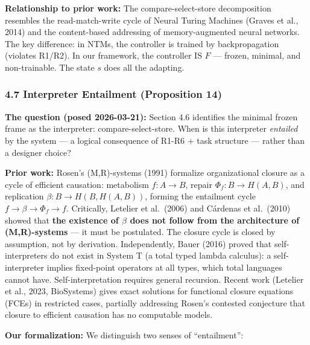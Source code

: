 \documentclass[
  11pt,
]{article}
\begin{document}
\textbf{Relationship to prior work:} The compare-select-store
decomposition resembles the read-match-write cycle of Neural Turing
Machines (Graves et al., 2014) and the content-based addressing of
memory-augmented neural networks. The key difference: in NTMs, the
controller is trained by backpropagation (violates R1/R2). In our
framework, the controller IS \(F\) --- frozen, minimal, and
non-trainable. The state \(s\) does all the adapting.

\subsubsection{4.7 Interpreter Entailment (Proposition
14)}\label{interpreter-entailment-proposition-14}

\textbf{The question (posed 2026-03-21):} Section 4.6 identifies the
minimal frozen frame as the interpreter: compare-select-store. When is
this interpreter \emph{entailed} by the system --- a logical consequence
of R1-R6 + task structure --- rather than a designer choice?

\textbf{Prior work:} Rosen's (M,R)-systems (1991) formalize
organizational closure as a cycle of efficient causation: metabolism
\(f: A \to B\), repair \(\Phi_f: B \to H(A,B)\), and replication
\(\beta: B \to H(B, H(A,B))\), forming the entailment cycle
\(f \to \beta \to \Phi_f \to f\). Critically, Letelier et al.~(2006) and
Cárdenas et al.~(2010) showed that \textbf{the existence of \(\beta\)
does not follow from the architecture of (M,R)-systems} --- it must be
postulated. The closure cycle is closed by assumption, not by
derivation. Independently, Bauer (2016) proved that self-interpreters do
not exist in System T (a total typed lambda calculus): a
self-interpreter implies fixed-point operators at all types, which total
languages cannot have. Self-interpretation requires general recursion.
Recent work (Letelier et al., 2023, BioSystems) gives exact solutions
for functional closure equations (FCEs) in restricted cases, partially
addressing Rosen's contested conjecture that closure to efficient
causation has no computable models.

\textbf{Our formalization:} We distinguish two senses of ``entailment'':
\end{document}
